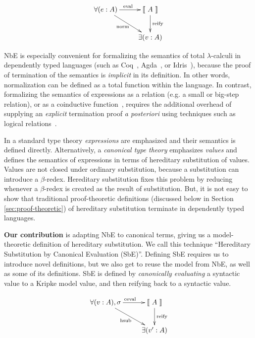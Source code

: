 \documentclass{llncs}
\newcommand{\refsec}[1]{Section \ref{sec:#1}}
\newcommand{\ascribe}[2]{(#1 : #2)}
\newcommand{\el}[1]{\llbracket ~ #1 ~ \rrbracket}
\newcommand{\fun}[1]{\textmd{#1}}
\begin{document}
\begin{displaymath}
    \xymatrix{
          {\forall (e : A)} 
          \ar[dr]_{\fun{norm}}
          \ar[r]^{\fun{eval}}
        & {\el{A}}
          \ar[d]^{\large{\fun{reify}}}
\\      & \exists (v : A) }
\end{displaymath}

NbE is especially convenient for formalizing the semantics of total
$\lambda$-calculi in dependently typed languages (such as
Coq~\cite{TODO}, Agda~\cite{TODO}, or Idris~\cite{TODO}), because the
proof of termination of the semantics is \textit{implicit} in its
definition. In other words, normalization can be defined as a total
function within the language.
In contrast, formalizing the semantics of expressions as a
relation (e.g. a small or big-step relation), or as a
coinductive function~\cite{TODO}, requires the additional overhead
of supplying an \textit{explicit}
termination proof \textit{a posteriori} using techniques such as
logical relations~\cite{TODO}.

In a standard type theory \textit{expressions} are emphasized and
their semantics is defined directly. Alternatively, a
\textit{canonical type theory} emphasizes \textit{values} and defines
the semantics of expressions in terms of hereditary substitution of
values. Values are not closed under ordinary substitution, because a
substitution can introduce a $\beta$-redex. Hereditary substitution
fixes this problem by reducing whenever a $\beta$-redex is created as
the result of substitution. But, it is not easy to show that
traditional proof-theoretic definitions (discussed below in
\refsec{proof-theoretic}) of hereditary substitution terminate in
dependently typed languages.

\textbf{Our contribution} is adapting NbE to canonical terms, giving us a model-theoretic
definition of hereditary substitution. We call this technique
``Hereditary Substitution by Canonical Evaluation (SbE)''. Defining
SbE requires us to introduce novel definitions, but we also get to
reuse the model from NbE, as well as some of its definitions. SbE is
defined by \textit{canonically evaluating} a syntactic value to a
Kripke model value, and then reifying back to a syntactic value.

\begin{displaymath}
    \xymatrix{
          \forall{\ascribe{v}{A}, \sigma}
          \ar[dr]_{\fun{hsub}}
          \ar[r]^{\fun{ceval}}
        & {\el{A}}
          \ar[d]^{\large{\fun{reify}}}
\\      & \exists{\ascribe{v'}{A}} }
\end{displaymath}
\end{document}
